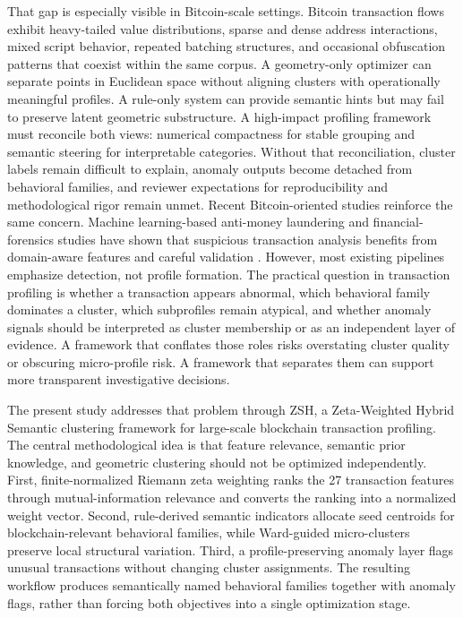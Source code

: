 \documentclass{ieeeaccess}
\begin{document}
That gap is especially visible in Bitcoin-scale settings. Bitcoin transaction flows exhibit heavy-tailed value distributions, sparse and dense address interactions, mixed script behavior, repeated batching structures, and occasional obfuscation patterns that coexist within the same corpus. A geometry-only optimizer can separate points in Euclidean space without aligning clusters with operationally meaningful profiles. A rule-only system can provide semantic hints but may fail to preserve latent geometric substructure. A high-impact profiling framework must reconcile both views: numerical compactness for stable grouping and semantic steering for interpretable categories. Without that reconciliation, cluster labels remain difficult to explain, anomaly outputs become detached from behavioral families, and reviewer expectations for reproducibility and methodological rigor remain unmet.
Recent Bitcoin-oriented studies reinforce the same concern. Machine learning-based anti-money laundering and financial-forensics studies have shown that suspicious transaction analysis benefits from domain-aware features and careful validation \cite{ref5,ref8,ref21,ref30}. However, most existing pipelines emphasize detection, not profile formation. The practical question in transaction profiling is whether a transaction appears abnormal, which behavioral family dominates a cluster, which subprofiles remain atypical, and whether anomaly signals should be interpreted as cluster membership or as an independent layer of evidence. A framework that conflates those roles risks overstating cluster quality or obscuring micro-profile risk. A framework that separates them can support more transparent investigative decisions.

The present study addresses that problem through ZSH, a Zeta-Weighted Hybrid Semantic clustering framework for large-scale blockchain transaction profiling. The central methodological idea is that feature relevance, semantic prior knowledge, and geometric clustering should not be optimized independently. First, finite-normalized Riemann zeta weighting ranks the 27 transaction features through mutual-information relevance and converts the ranking into a normalized weight vector. Second, rule-derived semantic indicators allocate seed centroids for blockchain-relevant behavioral families, while Ward-guided micro-clusters preserve local structural variation. Third, a profile-preserving anomaly layer flags unusual transactions without changing cluster assignments. The resulting workflow produces semantically named behavioral families together with anomaly flags, rather than forcing both objectives into a single optimization stage.
\end{document}
